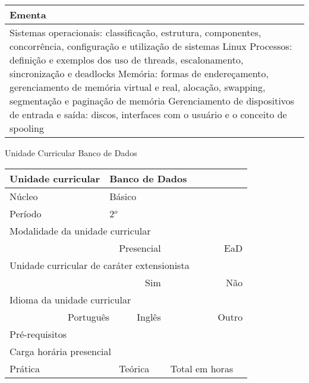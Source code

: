 \begin{quadro}[ht!]
\begin{tabular}{|p{3cm} p{2cm} p{3cm} p{2cm} p{3cm} p{2cm}|}
\multicolumn{6}{|p{15cm}|}{\cellcolor{blue1} Ementa} \\\hline
\hline\multicolumn{6}{|p{15cm}|}{\scriptsize Sistemas operacionais: classificação, estrutura, componentes, concorrência, configuração e utilização de sistemas Linux Processos: definição e exemplos dos uso de threads, escalonamento, sincronização e deadlocks Memória: formas de endereçamento, gerenciamento de memória virtual e real, alocação, swapping, segmentação e paginação de memória Gerenciamento de dispositivos de entrada e saída: discos, interfaces com o usuário e o conceito de spooling}\\\hline 
\hline
	\end{tabular}
\end{quadro}


\begin{quadro}[ht!]
  \centering\scriptsize
\caption{Unidade Curricular Banco de Dados}
\label{unit_9}
\begin{tabular}{|p{3cm} p{2cm} p{3cm} p{2cm} p{3cm} p{2cm}|}\hline
\multicolumn{1}{|p{3cm}|}{\cellcolor{blue1} Unidade curricular} & \multicolumn{5}{p{9cm}|}{Banco de Dados}\\\hline
\multicolumn{1}{|p{3cm}|}{\cellcolor{blue1} Núcleo} & \multicolumn{5}{p{11.5cm}|}{Básico}\\\hline
\multicolumn{1}{|p{3cm}|}{\cellcolor{blue1} Período} & \multicolumn{5}{p{9cm}|}{2$^o$}\\\hline
\multicolumn{6}{|p{15cm}|}{\cellcolor{blue1} Modalidade da unidade curricular} \\\hline
\multicolumn{2}{|r}{		} &  \multicolumn{2}{r}{Presencial \XBox} & \multicolumn{2}{r|}{EaD \Square	} \\\hline
\multicolumn{6}{|p{15cm}|}{\cellcolor{blue1} Unidade curricular de caráter extensionista} \\\hline
\multicolumn{4}{|r}{			Sim \Square	} & \multicolumn{2}{r|}{	Não \XBox	}\\\hline
\multicolumn{6}{|p{15cm}|}{\cellcolor{blue1} Idioma da unidade curricular} \\ \hline
\multicolumn{2}{|r}{	Português \XBox	} &  \multicolumn{2}{r}{	Inglês \Square	} & \multicolumn{2}{r|}{	Outro \Square	} \\ \hline
\multicolumn{1}{|p{3cm}|}{\cellcolor{blue1} Pré-requisitos} & \multicolumn{5}{p{9cm}|}{}\\ \hline
\multicolumn{6}{|p{15cm}|}{\cellcolor{blue1} Carga horária presencial} \\ \hline
\multicolumn{1}{|p{3cm}|}{\raggedleft Prática} & \multicolumn{1}{p{1cm}|}{\centering	45	} &  \multicolumn{1}{p{3cm}|}{\raggedleft Teórica}  & \multicolumn{1}{p{1cm}|}{\centering 	45	} & \multicolumn{1}{p{3cm}|}{\raggedleft Total em horas} & \multicolumn{1}{p{1cm}|}{\raggedleft	90	} \\ \hline 

\end{tabular}
\end{quadro}
